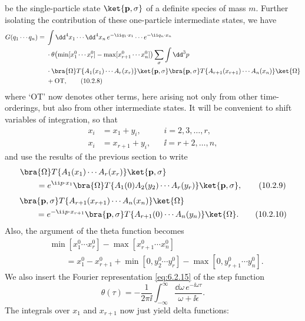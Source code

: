 be the single-particle state $\ket{\mathbf p,\sigma}$ of a definite species of mass $m$. Further
isolating the contribution of these one-particle intermediate states, we
have
\begin{align}
  G(q_1\cdots q_n)={}&\int \dd^4x_1\cdots \dd^4x_n\,
  e^{-\ii q_1\cdot x_1}\cdots e^{-\ii q_n\cdot x_n}
  \notag\\
  &\cdot\theta\!\left(\min[x_1^0\cdots x_r^0]
  -\max[x_{r+1}^0\cdots x_n^0]\right)
  \sum_\sigma\int \dd^3p
  \notag\\
  &\cdot\bra{\Omega}T\{A_1(x_1)\cdots A_r(x_r)\}\ket{\mathbf p,\sigma}
  \bra{\mathbf p,\sigma}T\{A_{r+1}(x_{r+1})\cdots A_n(x_n)\}\ket{\Omega}
  \notag\\
  &+\mathrm{OT},
  \tag{10.2.8}\label{eq:10.2.8}
\end{align}
where `OT' now denotes other terms, here arising not only from other time-orderings,
but also from other intermediate states. It will be convenient
to shift variables of integration, so that
\[
  \begin{aligned}
    x_i&=x_1+y_i, &&i=2,3,\ldots,r,\\
    x_i&=x_{r+1}+y_i, &&\ii=r+2,\ldots,n,
  \end{aligned}
\]
and use the results of the previous section to write
\begin{align}
  &\bra{\Omega}T\{A_1(x_1)\cdots A_r(x_r)\}\ket{\mathbf p,\sigma}
  \notag\\
  &\qquad=e^{\ii p\cdot x_1}
  \bra{\Omega}T\{A_1(0)A_2(y_2)\cdots A_r(y_r)\}\ket{\mathbf p,\sigma},
  \tag{10.2.9}\label{eq:10.2.9}
\end{align}
\begin{align}
  &\bra{\mathbf p,\sigma}T\{A_{r+1}(x_{r+1})\cdots A_n(x_n)\}\ket{\Omega}
  \notag\\
  &\qquad=e^{-\ii p\cdot x_{r+1}}
  \bra{\mathbf p,\sigma}T\{A_{r+1}(0)\cdots A_n(y_n)\}\ket{\Omega}.
  \tag{10.2.10}\label{eq:10.2.10}
\end{align}
Also, the argument of the theta function becomes
\begin{align*}
  &\min[x_1^0\cdots x_r^0]-\max[x_{r+1}^0\cdots x_n^0]
  \\
  &\qquad=x_1^0-x_{r+1}^0+\min[0,y_2^0\cdots y_r^0]
  -\max[0,y_{r+1}^0\cdots y_n^0].
\end{align*}
We also insert the Fourier representation \eqref{eq:6.2.15} of the step function
\[
  \theta(\tau)=-\frac{1}{2\pi \ii}\int_{-\infty}^{\infty}
  \frac{\dd\omega\,e^{-\ii\omega\tau}}{\omega+\ii\epsilon}.
\]
The integrals over $x_1$ and $x_{r+1}$ now just yield delta functions:
